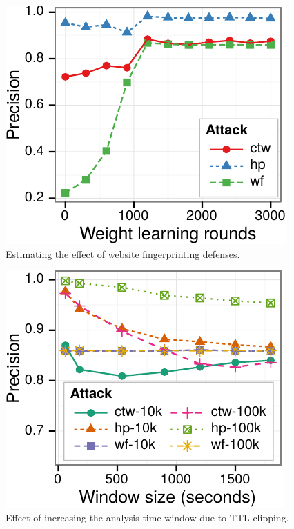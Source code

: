 \begin{figure}[t]
\centering
\includegraphics[width=0.7\linewidth]{figures/fpt/rounds/1kx100+100k-ggplot2}
\caption{Estimating the effect of website fingerprinting defenses.}
\label{fig:fpt:var:rounds}
\end{figure}

\begin{figure}[t]
\centering
    \includegraphics[width=0.95\linewidth]{figures/fpt/window/1kx100+100k-ggplot2}
\caption{Effect of increasing the analysis time window due to TTL clipping.}
    \label{fig:fpt:var:window}
\end{figure}

